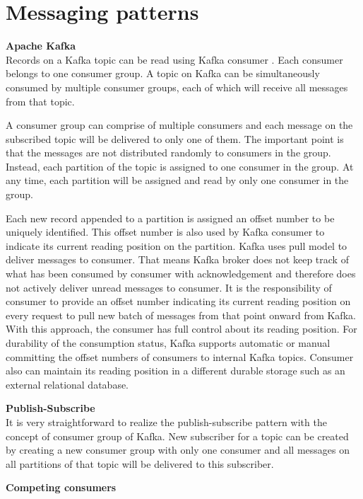 \section{Messaging patterns} \label{section:patterns}
\large \textbf{Apache Kafka}\\
\normalsize
Records on a Kafka topic can be read using Kafka consumer \cite{kafkadesignconsumer}.  Each consumer belongs to one consumer group. A topic on Kafka can be simultaneously consumed by multiple consumer groups, each of which will receive all messages from that topic. 
 
A consumer group can comprise of multiple consumers and each message on the subscribed topic will be delivered to only one of them. The important point is that the messages are not distributed randomly to consumers in the group. Instead, each partition of the topic is assigned to one consumer in the group. At any time, each partition will be assigned and read by only one consumer in the group. 

Each new record appended to a partition is assigned an offset number to be uniquely identified. This offset number is also used by Kafka consumer to indicate its current reading position on the partition. Kafka uses pull model to deliver messages to consumer. That means Kafka broker does not keep track of what has been consumed by consumer with acknowledgement and therefore does not actively deliver unread messages to consumer.  It is the responsibility of consumer to provide an offset number indicating its current reading position on every request to pull new batch of messages from that point onward from Kafka. With this approach, the consumer has full control about its reading position. For durability of the consumption status, Kafka supports automatic or manual committing the offset numbers of consumers to internal Kafka topics. Consumer also can maintain its reading position in a different durable storage such as an external relational database.

\textbf{Publish-Subscribe}\\
It is very straightforward to realize the publish-subscribe pattern with the concept of consumer group of Kafka. New subscriber for a topic can be created by creating a new consumer group with only one consumer and all messages on all partitions of that topic will be delivered to this subscriber.

\textbf{Competing consumers}\\

